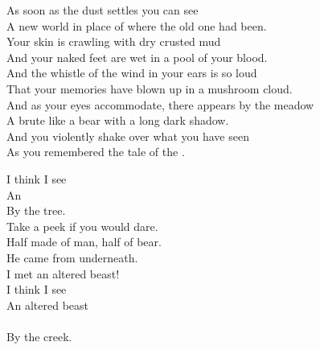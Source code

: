 
\label{album:murder-of-the-universe}





As soon as the dust settles you can see \\
A new world in place of where the old one had been. \\

Your skin is crawling with dry crusted mud \\
And your naked feet are wet in a pool of your blood. \\

And the whistle of the wind in your ears is so loud \\
That your memories have blown up in a mushroom cloud. \\

And as your eyes accommodate, there appears by the meadow \\
A brute like a bear with a long dark shadow. \\

And you violently shake over what you have seen \\
As you remembered the tale of the  . \\





I think I see \\
An   \\
By the tree. \\

Take a peek if you would dare. \\
Half made of man, half of bear. \\

He came from underneath. \\
I met an altered beast! \\

I think I see \\
An altered beast \\ \\
By the creek. \\

